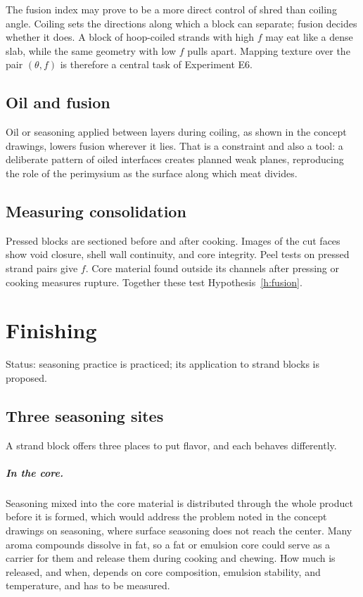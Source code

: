 \documentclass[11pt,openany]{book}
\theoremstyle{definition}
\begin{document}
The fusion index may prove to be a more direct control of shred than coiling angle. Coiling sets the directions along which a block can separate; fusion decides whether it does. A block of hoop-coiled strands with high $f$ may eat like a dense slab, while the same geometry with low $f$ pulls apart. Mapping texture over the pair $(\theta, f)$ is therefore a central task of Experiment E6.

\section{Oil and fusion}

Oil or seasoning applied between layers during coiling, as shown in the concept drawings, lowers fusion wherever it lies. That is a constraint and also a tool: a deliberate pattern of oiled interfaces creates planned weak planes, reproducing the role of the perimysium as the surface along which meat divides.

\section{Measuring consolidation}

Pressed blocks are sectioned before and after cooking. Images of the cut faces show void closure, shell wall continuity, and core integrity. Peel tests on pressed strand pairs give $f$. Core material found outside its channels after pressing or cooking measures rupture. Together these test Hypothesis~\ref{h:fusion}.

\chapter{Finishing}\label{ch:finishing}

Status: seasoning practice is practiced; its application to strand blocks is proposed.

\section{Three seasoning sites}

A strand block offers three places to put flavor, and each behaves differently.

\paragraph{In the core.} Seasoning mixed into the core material is distributed through the whole product before it is formed, which would address the problem noted in the concept drawings on seasoning, where surface seasoning does not reach the center. Many aroma compounds dissolve in fat, so a fat or emulsion core could serve as a carrier for them and release them during cooking and chewing. How much is released, and when, depends on core composition, emulsion stability, and temperature, and has to be measured.
\end{document}
